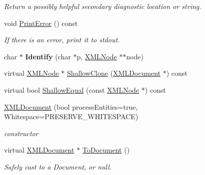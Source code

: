 \begin{DoxyCompactItemize}
\begin{DoxyCompactList}\small\item\em Return a possibly helpful secondary diagnostic location or string. \end{DoxyCompactList}\item 
\mbox{\label{classtinyxml2_1_1XMLDocument_a1d033945b42e125d933d6231e4571552}} 
void \hyperlink{classtinyxml2_1_1XMLDocument_a1d033945b42e125d933d6231e4571552}{Print\+Error} () const
\begin{DoxyCompactList}\small\item\em If there is an error, print it to stdout. \end{DoxyCompactList}\item 
\mbox{\label{classtinyxml2_1_1XMLDocument_a25827d1bec509ad566a107e5853ed040}} 
char $\ast$ {\bfseries Identify} (char $\ast$p, \hyperlink{classtinyxml2_1_1XMLNode}{X\+M\+L\+Node} $\ast$$\ast$node)
\item 
virtual \hyperlink{classtinyxml2_1_1XMLNode}{X\+M\+L\+Node} $\ast$ \hyperlink{classtinyxml2_1_1XMLDocument_aa37cc1709d7e1e988bc17dcfb24a69b8}{Shallow\+Clone} (\hyperlink{classtinyxml2_1_1XMLDocument}{X\+M\+L\+Document} $\ast$) const
\item 
virtual bool \hyperlink{classtinyxml2_1_1XMLDocument_a6fe5ef18699091844fcf64b56ffa5bf9}{Shallow\+Equal} (const \hyperlink{classtinyxml2_1_1XMLNode}{X\+M\+L\+Node} $\ast$) const
\item 
\mbox{\label{classtinyxml2_1_1XMLDocument_af1574f76ebb619f25ef3f09eb2ba5188}} 
\hyperlink{classtinyxml2_1_1XMLDocument_af1574f76ebb619f25ef3f09eb2ba5188}{X\+M\+L\+Document} (bool process\+Entities=true, Whitespace=P\+R\+E\+S\+E\+R\+V\+E\+\_\+\+W\+H\+I\+T\+E\+S\+P\+A\+CE)
\begin{DoxyCompactList}\small\item\em constructor \end{DoxyCompactList}\item 
\mbox{\label{classtinyxml2_1_1XMLDocument_a3e185f880882bd978367bb55937735ec}} 
virtual \hyperlink{classtinyxml2_1_1XMLDocument}{X\+M\+L\+Document} $\ast$ \hyperlink{classtinyxml2_1_1XMLDocument_a3e185f880882bd978367bb55937735ec}{To\+Document} ()
\begin{DoxyCompactList}\small\item\em Safely cast to a Document, or null. \end{DoxyCompactList}\item 
$$
\end{DoxyCompactItemize}

